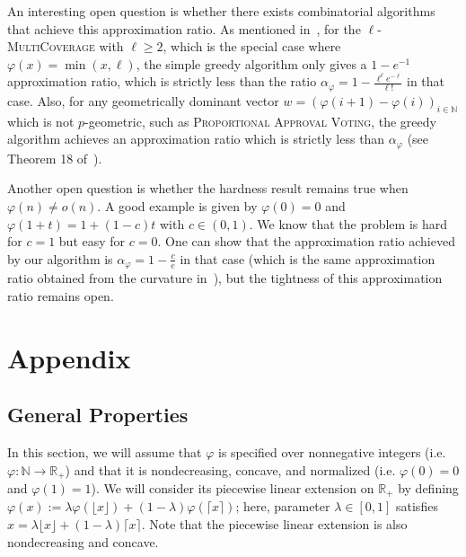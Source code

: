 An interesting open question is whether there exists combinatorial algorithms that achieve this approximation ratio. As mentioned in~\cite{BFGG20}, for the $\ell$-\textsc{MultiCoverage} with $\ell \geq 2$, which is the special case where $\varphi(x) = \min(x,\ell)$, the simple greedy algorithm only gives a $1 - e^{-1}$ approximation ratio, which is strictly less than the ratio $\alpha_{\varphi} = 1-\frac{\ell^{\ell}e^{-\ell}}{\ell!}$ in that case. Also, for any geometrically dominant vector $w=(\varphi(i+1)-\varphi(i))_{i \in \mathbb{N}}$ which is not $p$-geometric, such as \textsc{Proportional Approval Voting}, the greedy algorithm achieves an approximation ratio which is strictly less than $\alpha_{\varphi}$ (see Theorem 18 of~\cite{DMMS20}).

Another open question is whether the hardness result remains true when $\varphi(n) \not= o(n)$. A good example is given by $\varphi(0)=0$ and $\varphi(1+t) = 1 + (1-c)t$ with $c \in (0,1)$. We know that the problem is hard for $c=1$ but easy for $c=0$. One can show that the approximation ratio achieved by our algorithm is $\alpha_{\varphi} = 1 - \frac{c}{e}$ in that case (which is the same approximation ratio obtained from the curvature in~\cite{SVW17}), but the tightness of this approximation ratio remains open.

\newpage
\section{Appendix}
\subsection{General Properties}
In this section, we will assume that $\varphi$ is specified over nonnegative integers (i.e. $\varphi : \mathbb{N} \rightarrow \mathbb{R}_+$) and that it is nondecreasing, concave, and normalized (i.e. $\varphi(0)=0$ and $\varphi(1)=1$). We will consider its piecewise linear extension on $\mathbb{R}_+$ by defining $\varphi(x) := \lambda \varphi(\lfloor x \rfloor) + (1-\lambda)\varphi(\lceil x \rceil)$; here, parameter $\lambda\in [0,1]$ satisfies $x = \lambda\lfloor x \rfloor + (1-\lambda)\lceil x \rceil$. Note that the piecewise linear extension is also nondecreasing and concave.

